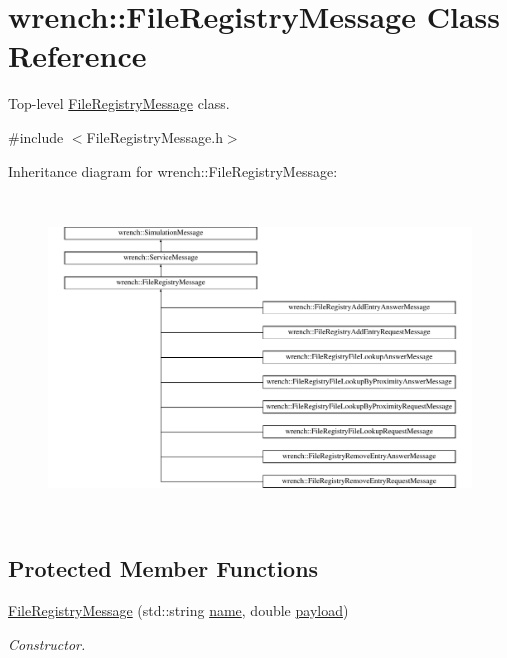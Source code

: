 \hypertarget{classwrench_1_1_file_registry_message}{}\section{wrench\+:\+:File\+Registry\+Message Class Reference}
\label{classwrench_1_1_file_registry_message}


Top-\/level \hyperlink{classwrench_1_1_file_registry_message}{File\+Registry\+Message} class.  




{\ttfamily \#include $<$File\+Registry\+Message.\+h$>$}

Inheritance diagram for wrench\+:\+:File\+Registry\+Message\+:\begin{figure}[H]
\begin{center}
\leavevmode
\includegraphics[height=8.603352cm]{classwrench_1_1_file_registry_message}
\end{center}
\end{figure}
\subsection*{Protected Member Functions}
\begin{DoxyCompactItemize}
\item 
\hyperlink{classwrench_1_1_file_registry_message_a52902c49d15ab099f7ee1266652f62e3}{File\+Registry\+Message} (std\+::string \hyperlink{classwrench_1_1_simulation_message_ab224f6dd8ec5ee2e7f65bfcdf2b8a86b}{name}, double \hyperlink{classwrench_1_1_simulation_message_a914f2732713f7c02898e66f05a7cb8a1}{payload})
\begin{DoxyCompactList}\small\item\em Constructor. \end{DoxyCompactList}\end{DoxyCompactItemize}
